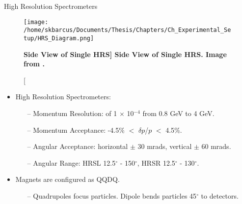 \documentclass[10pt]{beamer}
\begin{document}
\begin{frame}[fragile]{High Resolution Spectrometers}

	\begin{figure}[!ht]
	\begin{center}
	\texttt{[image: /home/skbarcus/Documents/Thesis/Chapters/Ch\_Experimental\_Setup/HRS\_Diagram.png]}
	\end{center}
	\caption[\bf{Side View of Single HRS}]{
	{\bf{Side View of Single HRS.}} Image from \cite{Thesis:Wang}.}
	\label{fig:halla_top}
	\end{figure}

	\vspace{-5mm}
	\begin{itemize}
		\pause
		\item \alert{H}igh \alert{R}esolution \alert{S}pectrometers:
			\begin{itemize}
				\item[--] \alert{Momentum Resolution}: of 1 $\times$ 10$^{-4}$ from 0.8 GeV to 4 GeV.
				\item[--] \alert{Momentum Acceptance}: -4.5$\%$ $<$ $\delta p$/$p$ $<$ 4.5$\%$.
				\item[--] \alert{Angular Acceptance}: horizontal $\pm$ 30 mrads, vertical $\pm$ 60 mrads.
				\item[--] \alert{Angular Range}: HRSL 12.5$^{\circ}$ - 150$^{\circ}$, HRSR 12.5$^{\circ}$ - 130$^{\circ}$.
			\end{itemize}
			\pause
			\item Magnets are configured as \alert{QQ}\alert{D}\alert{Q}.
			\begin{itemize}
				\item[--] \alert{Quadrupoles focus particles}. \alert{Dipole bends particles 45$^{\circ}$ to detectors}.
			\end{itemize}
	\end{itemize}
	
\end{frame}
\end{document}
